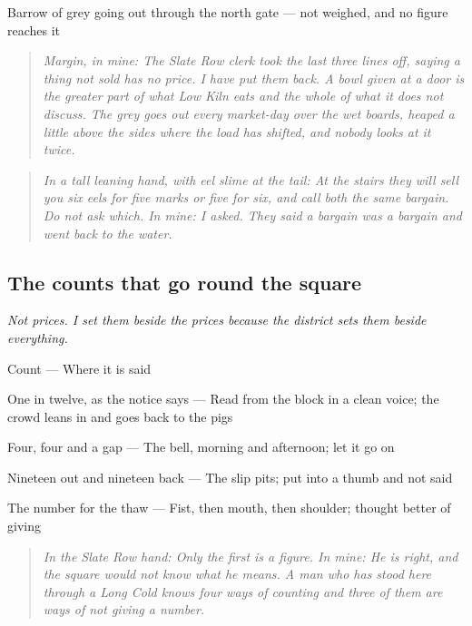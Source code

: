 \documentclass{design/chronicle}
\begin{document}
Barrow of grey going out through the north gate — not weighed, and no figure reaches it\par

\begin{quote}\itshape \emph{Margin, in mine:} The Slate Row clerk took the last three lines off, saying a thing not sold has no price. I have put them back. A bowl given at a door is the greater part of what Low Kiln eats and the whole of what it does not discuss. The grey goes out every market-day over the wet boards, heaped a little above the sides where the load has shifted, and nobody looks at it twice.\end{quote}

\begin{quote}\itshape \emph{In a tall leaning hand, with eel slime at the tail:} At the stairs they will sell you six eels for five marks or five for six, and call both the same bargain. Do not ask which. \emph{In mine:} I asked. They said a bargain was a bargain and went back to the water.\end{quote}

\subsection*{The counts that go round the square}

\emph{Not prices. I set them beside the prices because the district sets them beside everything.}

Count — Where it is said\par

One in twelve, as the notice says — Read from the block in a clean voice; the crowd leans in and goes back to the pigs\par

Four, four and a gap — The bell, morning and afternoon; let it go on\par

Nineteen out and nineteen back — The slip pits; put into a thumb and not said\par

The number for the thaw — Fist, then mouth, then shoulder; thought better of giving\par

\begin{quote}\itshape \emph{In the Slate Row hand:} Only the first is a figure. \emph{In mine:} He is right, and the square would not know what he means. A man who has stood here through a Long Cold knows four ways of counting and three of them are ways of not giving a number.\end{quote}
\end{document}
